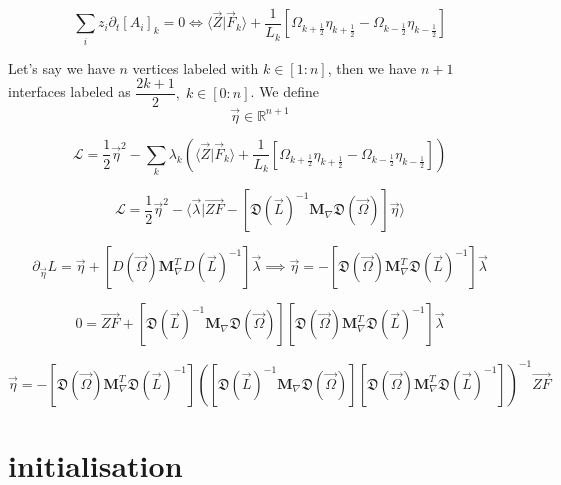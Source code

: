 \documentclass[aps,12pt]{revtex4}
\newcommand{\half}{\frac{1}{2}}
\begin{document}
\begin{equation}
	\sum_i z_i \partial_t [A_i]_k = 0 \iff \langle \vec Z \vert \vec F_k \rangle
	 + \dfrac{1}{L_k}\left[\Omega_{k+\half} \eta_{k+\half} - \Omega_{k-\half} \eta_{k-\half}\right]
\end{equation}

Let's say we have $n$ vertices labeled with $k\in[1:n]$, then we have $n+1$ interfaces labeled as $\dfrac{2k+1}{2},\;k\in[0:n]$.
We define
\begin{equation}
	\vec \eta \in \mathbb R ^ {n+1}
\end{equation}

\begin{equation}
	\mathcal L = \dfrac{1}{2} \vec \eta ^2 - \sum_k \lambda_k \left(\langle \vec Z \vert \vec F_k \rangle
	 + \dfrac{1}{L_k}\left[\Omega_{k+\half} \eta_{k+\half} - \Omega_{k-\half} \eta_{k-\half}\right]\right)
\end{equation}

\begin{equation}
	\mathcal L = \dfrac{1}{2} \vec \eta ^2 - \langle \vec \lambda \vert \vec{ZF} - 
	\left[\mathfrak D (\vec L)^{-1} \bm M_\nabla \mathfrak D(\vec\Omega)\right] \vec \eta \rangle
\end{equation}

\begin{equation}
	\partial_{\vec \eta} L = \vec \eta +\left[ D(\vec\Omega) \bm M_\nabla ^T D (\vec L)^{-1} \right] \vec \lambda
	\implies \vec \eta = - \left[ \mathfrak D(\vec\Omega) \bm M_\nabla ^T \mathfrak D (\vec L)^{-1} \right] \vec \lambda
\end{equation}

\begin{equation}
	0 = \vec {ZF} + \left[\mathfrak D (\vec L)^{-1} \bm M_\nabla \mathfrak D(\vec\Omega)\right] 
	\left[ \mathfrak D(\vec\Omega) \bm M_\nabla ^T \mathfrak D (\vec L)^{-1} \right] \vec \lambda
\end{equation}

\begin{equation}
	\vec \eta = - \left[ \mathfrak D(\vec\Omega) \bm M_\nabla ^T \mathfrak D (\vec L)^{-1} \right] \left( \left[\mathfrak D (\vec L)^{-1} \bm M_\nabla \mathfrak D(\vec\Omega)\right] \left[ \mathfrak D(\vec\Omega) \bm M_\nabla ^T \mathfrak D (\vec L)^{-1} \right]\right) ^{-1} \vec{ZF}
\end{equation}


\section{initialisation}
\end{document}
